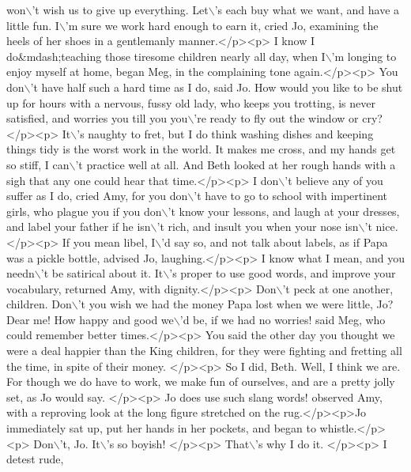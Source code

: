 \begin{DoxyCode}
{       won\(\backslash\)'t wish us to give up everything. Let\(\backslash\)'s each buy what we want, and have a little fun. I\(\backslash\)'m sure we work
       hard enough to earn it,  cried Jo, examining the heels of her shoes in a gentlemanly manner.</p><p> I know I
       do&mdash;teaching those tiresome children nearly all day, when I\(\backslash\)'m longing to enjoy myself at home,  began
       Meg, in the complaining tone again.</p><p> You don\(\backslash\)'t have half such a hard time as I do,  said Jo.  How
       would you like to be shut up for hours with a nervous, fussy old lady, who keeps you trotting, is never
       satisfied, and worries you till you you\(\backslash\)'re ready to fly out the window or cry? </p><p> It\(\backslash\)'s naughty to fret, but
       I do think washing dishes and keeping things tidy is the worst work in the world.  It makes me cross, and
       my hands get so stiff, I can\(\backslash\)'t practice well at all.  And Beth looked at her rough hands with a sigh that
       any one could hear that time.</p><p> I don\(\backslash\)'t believe any of you suffer as I do,  cried Amy,  for you don\(\backslash\)'t
       have to go to school with impertinent girls, who plague you if you don\(\backslash\)'t know your lessons, and laugh at
       your dresses, and label your father if he isn\(\backslash\)'t rich, and insult you when your nose isn\(\backslash\)'t nice. </p><p> If
       you mean libel, I\(\backslash\)'d say so, and not talk about labels, as if Papa was a pickle bottle,  advised Jo,
       laughing.</p><p> I know what I mean, and you needn\(\backslash\)'t be satirical about it. It\(\backslash\)'s proper to use good words, and
       improve your vocabulary,  returned Amy, with dignity.</p><p> Don\(\backslash\)'t peck at one another, children. Don\(\backslash\)'t you
       wish we had the money Papa lost when we were little, Jo? Dear me! How happy and good we\(\backslash\)'d be, if we had no
       worries!  said Meg, who could remember better times.</p><p> You said the other day you thought we were a deal
       happier than the King children, for they were fighting and fretting all the time, in spite of their money.
       </p><p> So I did, Beth. Well, I think we are. For though we do have to work, we make fun of ourselves, and
       are a pretty jolly set, as Jo would say. </p><p> Jo does use such slang words!   observed Amy, with a
       reproving look at the long figure stretched on the rug.</p><p>Jo immediately sat up, put her hands in her pockets,
       and began to whistle.</p><p> Don\(\backslash\)'t, Jo. It\(\backslash\)'s so boyish! </p><p> That\(\backslash\)'s why I do it. </p><p> I detest rude,
}
\end{DoxyCode}
